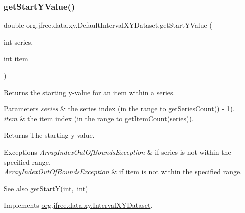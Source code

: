 \subsubsection{\texorpdfstring{get\+Start\+Y\+Value()}{getStartYValue()}}
{\footnotesize\ttfamily double org.\+jfree.\+data.\+xy.\+Default\+Interval\+X\+Y\+Dataset.\+get\+Start\+Y\+Value (\begin{DoxyParamCaption}\item[{int}]{series,  }\item[{int}]{item }\end{DoxyParamCaption})}

Returns the starting y-\/value for an item within a series.


\begin{DoxyParams}{Parameters}
{\em series} & the series index (in the range {} to {\ttfamily \mbox{\hyperlink{classorg_1_1jfree_1_1data_1_1xy_1_1_default_interval_x_y_dataset_a11470bfa9b540c971123d4282c0f5a8a}{get\+Series\+Count()}} -\/ 1}). \\
\hline
{\em item} & the item index (in the range {} to {\ttfamily get\+Item\+Count(series)}).\\
\hline
\end{DoxyParams}
\begin{DoxyReturn}{Returns}
The starting y-\/value.
\end{DoxyReturn}

\begin{DoxyExceptions}{Exceptions}
{\em Array\+Index\+Out\+Of\+Bounds\+Exception} & if {\ttfamily series} is not within the specified range. \\
\hline
{\em Array\+Index\+Out\+Of\+Bounds\+Exception} & if {\ttfamily item} is not within the specified range.\\
\hline
\end{DoxyExceptions}
\begin{DoxySeeAlso}{See also}
\mbox{\hyperlink{classorg_1_1jfree_1_1data_1_1xy_1_1_default_interval_x_y_dataset_ad9406f2afbf209d346903c0a004f4aad}{get\+Start\+Y(int, int)}} 
\end{DoxySeeAlso}


Implements \mbox{\hyperlink{interfaceorg_1_1jfree_1_1data_1_1xy_1_1_interval_x_y_dataset_aed1acf6e36561ce5acc3f6811a2ecef9}{org.\+jfree.\+data.\+xy.\+Interval\+X\+Y\+Dataset}}.

\mbox{\label{classorg_1_1jfree_1_1data_1_1xy_1_1_default_interval_x_y_dataset_a73bb4e27acf510ab125c2a2c1fb4020a}} 
